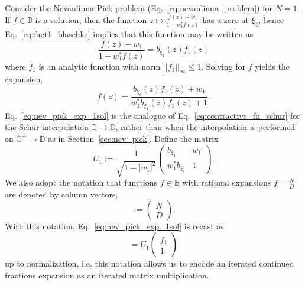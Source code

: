 Consider the Nevanlinna-Pick problem (Eq.~\eqref{eq:nevanlinna_problem}) for $N = 1$. If $f\in\mathbb B$ is a solution, then the function $z\mapsto \frac{f(z) - w_1}{1 - w_1^* f(z)}$ has a zero at $\xi_1$, hence Eq.~\eqref{eq:fact1_blaschke} implies that this function may be written as
\begin{equation}
    \frac{f(z) - w_1}{1 - w_1^* f(z)} = b_{\xi_1}(z) f_1(z)
\end{equation}
where $f_1$ is an analytic function with norm $||f_1||_\infty\leq 1$. Solving for $f$ yields the expansion,
\begin{equation}
    f(z) = \frac{b_{\xi_1}(z) f_1(z) + w_1}{w_1^* b_{\xi_1}(z) f_1(z) + 1}.
    \label{eq:nev_pick_exp_1sol}
\end{equation}
Eq.~\eqref{eq:nev_pick_exp_1sol} is the analogue of Eq.~\eqref{eq:contractive_fn_schur} for the Schur interpolation $\mathbb D\rightarrow \mathbb D$, rather than when the interpolation is performed on $\mathbb C^+\rightarrow\mathbb D$ as in Section~\ref{sec:nev_pick}. Define the matrix
\begin{equation}
    U_1 := \frac{1}{\sqrt{1 - |w_1|^2}} \begin{pmatrix}
        b_{\xi_1} & w_1 \\ 
        w_1^* b_{\xi_1} & 1
    \end{pmatrix}. 
\end{equation}
We also adopt the notation that functions $f\in \mathbb B$ with rational expansions $f = \frac{N}{D}$ are denoted by column vectors,
\begin{equation}
    [f] := \begin{pmatrix}
        N \\ D
    \end{pmatrix}.
\end{equation}
With this notation, Eq.~\eqref{eq:nev_pick_exp_1sol} is recast as
\begin{equation}
    [f] = U_1 \begin{pmatrix} f_1 \\ 1 \end{pmatrix}
\end{equation}
up to normalization, i.e. this notation allows us to encode an iterated continued fractions expansion as an iterated matrix multiplication. 


